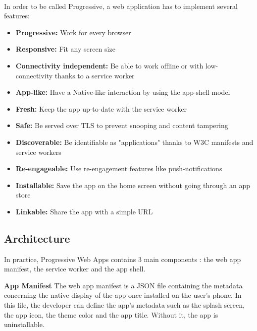 \documentclass{kththesis}
\begin{document}
\paragraph{}
In order to be called Progressive, a web application has to implement several features\cite{PWA_def}:

\begin{itemize}
    \item \textbf{Progressive:} Work for every browser
    \item \textbf{Responsive:} Fit any screen size
    \item \textbf{Connectivity independent:} Be able to work offline or with low-connectivity thanks to a service worker
    \item \textbf{App-like:} Have a Native-like interaction by using the app-shell model
    \item \textbf{Fresh:} Keep the app up-to-date with the service worker
    \item \textbf{Safe:} Be served over TLS to prevent snooping and content tampering
    \item \textbf{Discoverable:} Be identifiable as "applications" thanks to W3C manifests and service workers
    \item \textbf{Re-engageable:} Use re-engagement features like push-notifications
    \item \textbf{Installable:} Save the app on the home screen without going through an app store
    \item \textbf{Linkable:} Share the app with a simple URL
\end{itemize}

\subsection{Architecture}

In practice, Progressive Web Apps contains 3 main components : the web app manifest, the service worker and the app shell. 

\medskip
\textbf{App Manifest} \newline
The web app manifest is a JSON file containing the metadata concerning the native display of the app once installed on the user's phone. In this file, the developer can define the app's metadata such as the splash screen, the app icon, the theme color and the app title. Without it, the app is uninstallable.
\end{document}
